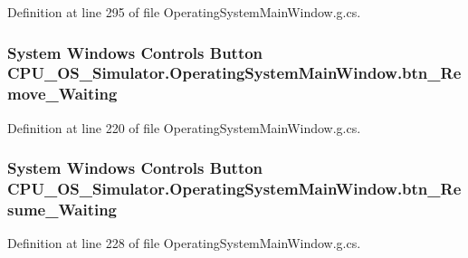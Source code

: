Definition at line 295 of file Operating\+System\+Main\+Window.\+g.\+cs.

\hypertarget{class_c_p_u___o_s___simulator_1_1_operating_system_main_window_a802d545b8ca3b04953277e409aef535f}{}
\subsubsection[{btn\+\_\+\+Remove\+\_\+\+Waiting}]{\setlength{\rightskip}{0pt plus 5cm}System Windows Controls Button C\+P\+U\+\_\+\+O\+S\+\_\+\+Simulator.\+Operating\+System\+Main\+Window.\+btn\+\_\+\+Remove\+\_\+\+Waiting\hspace{0.3cm}{\ttfamily [package]}}\label{class_c_p_u___o_s___simulator_1_1_operating_system_main_window_a802d545b8ca3b04953277e409aef535f}


Definition at line 220 of file Operating\+System\+Main\+Window.\+g.\+cs.

\hypertarget{class_c_p_u___o_s___simulator_1_1_operating_system_main_window_a1f1064712f5d86ad7c818f1eabef4b05}{}
\subsubsection[{btn\+\_\+\+Resume\+\_\+\+Waiting}]{\setlength{\rightskip}{0pt plus 5cm}System Windows Controls Button C\+P\+U\+\_\+\+O\+S\+\_\+\+Simulator.\+Operating\+System\+Main\+Window.\+btn\+\_\+\+Resume\+\_\+\+Waiting\hspace{0.3cm}{\ttfamily [package]}}\label{class_c_p_u___o_s___simulator_1_1_operating_system_main_window_a1f1064712f5d86ad7c818f1eabef4b05}


Definition at line 228 of file Operating\+System\+Main\+Window.\+g.\+cs.

